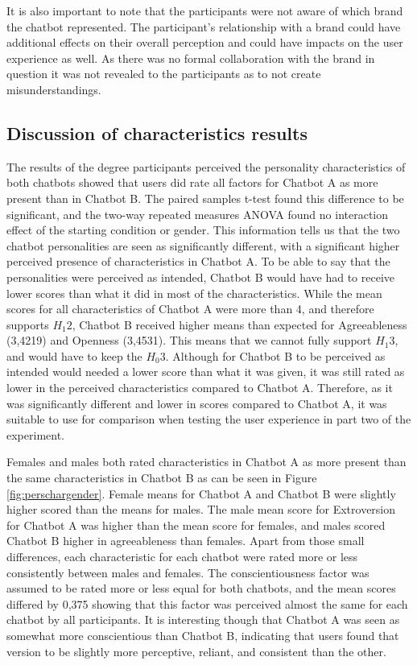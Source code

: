 It is also important to note that the participants were not aware of which brand the chatbot represented. The participant's relationship with a brand could have additional effects on their overall perception and could have impacts on the user experience as well. As there was no formal collaboration with the brand in question it was not revealed to the participants as to not create misunderstandings.


\subsection{Discussion of characteristics results}
The results of the degree participants perceived the personality characteristics of both chatbots showed that users did rate all factors for Chatbot A as more present than in Chatbot B. The paired samples t-test found this difference to be significant, and the two-way repeated measures ANOVA found no interaction effect of the starting condition or gender. This information tells us that the two chatbot personalities are seen as significantly different, with a significant higher perceived presence of characteristics in Chatbot A. To be able to say that the personalities were perceived as intended, Chatbot B would have had to receive lower scores than what it did in most of the characteristics. While the mean scores for all characteristics of Chatbot A were more than 4, and therefore supports $H_1 2$, Chatbot B received higher means than expected for Agreeableness (3,4219) and Openness (3,4531). This means that we cannot fully support $H_1 3$, and would have to keep the $H_0 3$. Although for Chatbot B to be perceived as intended would needed a lower score than what it was given, it was still rated as lower in the perceived characteristics compared to Chatbot A. Therefore, as it was significantly different and lower in scores compared to Chatbot A, it was suitable to use for comparison when testing the user experience in part two of the experiment.

Females and males both rated characteristics in Chatbot A as more present than the same characteristics in Chatbot B as can be seen in Figure \ref{fig:perschargender}. Female means for Chatbot A and Chatbot B were slightly higher scored than the means for males. The male mean score for Extroversion for Chatbot A was higher than the mean score for females, and males scored Chatbot B higher in agreeableness than females. Apart from those small differences, each characteristic for each chatbot were rated more or less consistently between males and females. The conscientiousness factor was assumed to be rated more or less equal for both chatbots, and the mean scores differed by 0,375 showing that this factor was perceived almost the same for each chatbot by all participants. It is interesting though that Chatbot A was seen as somewhat more conscientious than Chatbot B, indicating that users found that version to be slightly more perceptive, reliant, and consistent than the other.  

